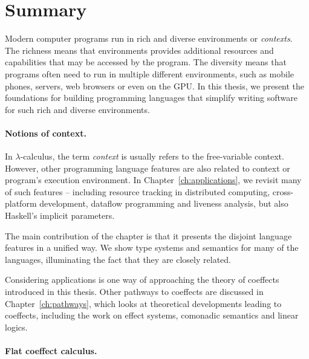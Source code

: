 \section{Summary}
\label{sec:conc-summary}

Modern computer programs run in rich and diverse environments or \emph{contexts}. The richness means
that environments provides additional resources and capabilities that may be accessed by the program.
The diversity means that programs often need to run in multiple different environments, such as mobile
phones, servers, web browsers or even on the GPU. In this thesis, we present the foundations for
building programming languages that simplify writing software for such rich and diverse environments.


\paragraph{Notions of context.}

In $\lambda$-calculus, the term \emph{context} is usually refers to the free-variable context.
However, other programming language features are also related to context or program's
execution environment. In Chapter~\ref{ch:applications}, we revisit many of such features --
including resource tracking in distributed computing, cross-platform development, dataflow
programming and liveness analysis, but also Haskell's implicit parameters.

The main contribution of the chapter is that it presents the disjoint language features in a
unified way. We show type systems and semantics for many of the languages, illuminating
the fact that they are closely related.

Considering applications is one way of approaching the theory of coeffects introduced in this thesis.
Other pathways to coeffects are discussed in Chapter~\ref{ch:pathways}, which looks at theoretical
developments leading to coeffects, including the work on effect systems, comonadic semantics and
linear logics.


\paragraph{Flat coeffect calculus.}

